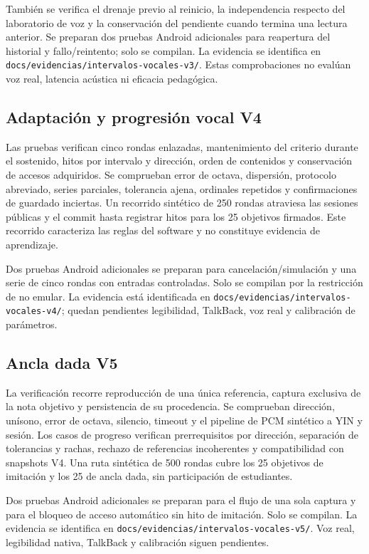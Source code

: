 También se verifica el drenaje previo al reinicio, la independencia respecto
del laboratorio de voz y la conservación del pendiente cuando termina una
lectura anterior. Se preparan dos pruebas Android adicionales para reapertura
del historial y fallo/reintento; solo se compilan. La evidencia se identifica en
\texttt{docs/evidencias/intervalos-vocales-v3/}. Estas comprobaciones no evalúan
voz real, latencia acústica ni eficacia pedagógica.

\subsection{Adaptación y progresión vocal V4}
Las pruebas verifican cinco rondas enlazadas, mantenimiento del criterio
durante el sostenido, hitos por intervalo y dirección, orden de contenidos
y conservación de accesos adquiridos. Se comprueban error de octava,
dispersión, protocolo abreviado, series parciales, tolerancia ajena, ordinales
repetidos y confirmaciones de guardado inciertas. Un recorrido sintético de
250 rondas atraviesa las sesiones públicas y el commit hasta registrar hitos
para los 25 objetivos firmados. Este recorrido caracteriza las reglas del
software y no constituye evidencia de aprendizaje.

Dos pruebas Android adicionales se preparan para cancelación/simulación y
una serie de cinco rondas con entradas controladas. Solo se compilan por la
restricción de no emular. La evidencia está identificada en
\texttt{docs/evidencias/intervalos-vocales-v4/}; quedan pendientes legibilidad,
TalkBack, voz real y calibración de parámetros.

\subsection{Ancla dada V5}
La verificación recorre reproducción de una única referencia, captura exclusiva
de la nota objetivo y persistencia de su procedencia. Se comprueban dirección,
unísono, error de octava, silencio, timeout y el pipeline de PCM sintético a YIN
y sesión. Los casos de progreso verifican prerrequisitos por dirección, separación
de tolerancias y rachas, rechazo de referencias incoherentes y compatibilidad
con snapshots V4. Una ruta sintética de 500 rondas cubre los 25 objetivos de
imitación y los 25 de ancla dada, sin participación de estudiantes.

Dos pruebas Android adicionales se preparan para el flujo de una sola captura
y para el bloqueo de acceso automático sin hito de imitación. Solo se compilan.
La evidencia se identifica en \texttt{docs/evidencias/intervalos-vocales-v5/}.
Voz real, legibilidad nativa, TalkBack y calibración siguen pendientes.

